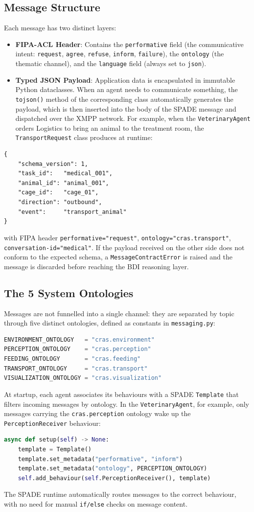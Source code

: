 \documentclass{article}
\renewcommand{\_}{\oldtextunderscore\allowbreak}
\begin{document}
\subsection{Message Structure}
Each message has two distinct layers:
\begin{itemize}
    \item \textbf{FIPA-ACL Header}: Contains the \texttt{performative} field (the communicative intent: \texttt{request}, \texttt{agree}, \texttt{refuse}, \texttt{inform}, \texttt{failure}), the \texttt{ontology} (the thematic channel), and the \texttt{language} field (always set to \texttt{json}).
    \item \textbf{Typed JSON Payload}: Application data is encapsulated in immutable Python dataclasses. When an agent needs to communicate something, the \texttt{to\_json()} method of the corresponding class automatically generates the payload, which is then inserted into the body of the SPADE message and dispatched over the XMPP network. For example, when the \texttt{VeterinaryAgent} orders Logistics to bring an animal to the treatment room, the \texttt{TransportRequest} class produces at runtime:
\end{itemize}
\begin{lstlisting}[language={}]
{
    "schema_version": 1,
    "task_id":   "medical_001",
    "animal_id": "animal_001",
    "cage_id":   "cage_01",
    "direction": "outbound",
    "event":     "transport_animal"
}
\end{lstlisting}
with FIPA header \texttt{performative="request"}, \texttt{ontology="cras.transport"}, \texttt{conversation-id="medical\_001"}. If the payload received on the other side does not conform to the expected schema, a \texttt{MessageContractError} is raised and the message is discarded before reaching the BDI reasoning layer.
\subsection{The 5 System Ontologies}
Messages are not funnelled into a single channel: they are separated by topic through five distinct ontologies, defined as constants in \texttt{messaging.py}:
\begin{lstlisting}[language=Python]
ENVIRONMENT_ONTOLOGY   = "cras.environment"
PERCEPTION_ONTOLOGY    = "cras.perception"
FEEDING_ONTOLOGY       = "cras.feeding"
TRANSPORT_ONTOLOGY     = "cras.transport"
VISUALIZATION_ONTOLOGY = "cras.visualization"
\end{lstlisting}
At startup, each agent associates its behaviours with a SPADE \texttt{Template} that filters incoming messages by ontology. In the \texttt{VeterinaryAgent}, for example, only messages carrying the \texttt{cras.perception} ontology wake up the \texttt{PerceptionReceiver} behaviour:
\begin{lstlisting}[language=Python]
async def setup(self) -> None:
    template = Template()
    template.set_metadata("performative", "inform")
    template.set_metadata("ontology", PERCEPTION_ONTOLOGY)
    self.add_behaviour(self.PerceptionReceiver(), template)
\end{lstlisting}
The SPADE runtime automatically routes messages to the correct behaviour, with no need for manual \texttt{if/else} checks on message content.
\end{document}

